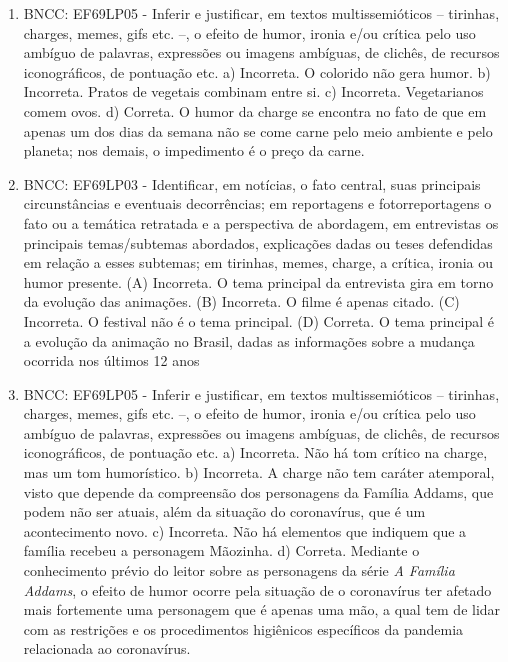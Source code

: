 
\begin{enumerate}
\item
BNCC: EF69LP05 - Inferir e justificar, em textos multissemióticos --
tirinhas, charges, memes, gifs etc. --, o efeito de humor, ironia e/ou
crítica pelo uso ambíguo de palavras, expressões ou imagens ambíguas, de
clichês, de recursos iconográficos, de pontuação etc.
 a) Incorreta. O colorido não gera humor. b) Incorreta. Pratos de vegetais combinam entre si. c) Incorreta. Vegetarianos comem ovos. d) Correta. O humor da charge se encontra no fato de que em apenas um dos dias da semana não se come carne pelo meio ambiente e pelo planeta; nos demais, o impedimento é o preço da carne.

\item
BNCC: EF69LP03 - Identificar, em notícias, o fato central, suas
principais circunstâncias e eventuais decorrências; em reportagens e
fotorreportagens o fato ou a temática retratada e a perspectiva de
abordagem, em entrevistas os principais temas/subtemas abordados,
explicações dadas ou teses defendidas em relação a esses subtemas; em
tirinhas, memes, charge, a crítica, ironia ou humor presente. (A) Incorreta. O tema principal da entrevista gira em torno da evolução das animações. (B) Incorreta. O filme é apenas citado. (C) Incorreta. O festival não é o tema principal. (D) Correta. O tema principal é a evolução da animação no Brasil, dadas
as informações sobre a mudança ocorrida nos últimos 12 anos

\item
BNCC: EF69LP05 - Inferir e justificar, em textos multissemióticos --
tirinhas, charges, memes, gifs etc. --, o efeito de humor, ironia e/ou
crítica pelo uso ambíguo de palavras, expressões ou imagens ambíguas, de
clichês, de recursos iconográficos, de pontuação etc.
 a) Incorreta. Não há tom crítico na charge, mas um tom humorístico. b) Incorreta. A charge não tem caráter atemporal, visto que depende da compreensão dos personagens da Família Addams, que podem não ser atuais, além da situação do coronavírus, que é um acontecimento novo. c) Incorreta. Não há elementos que indiquem que a família recebeu a personagem Mãozinha. d) Correta. Mediante o conhecimento prévio do leitor sobre as personagens da série \emph{A Família Addams}, o efeito de humor ocorre pela situação de o coronavírus ter afetado mais fortemente uma personagem que é apenas uma mão, a qual tem de lidar com as restrições e os procedimentos higiênicos específicos da pandemia relacionada ao coronavírus.
\end{enumerate}

